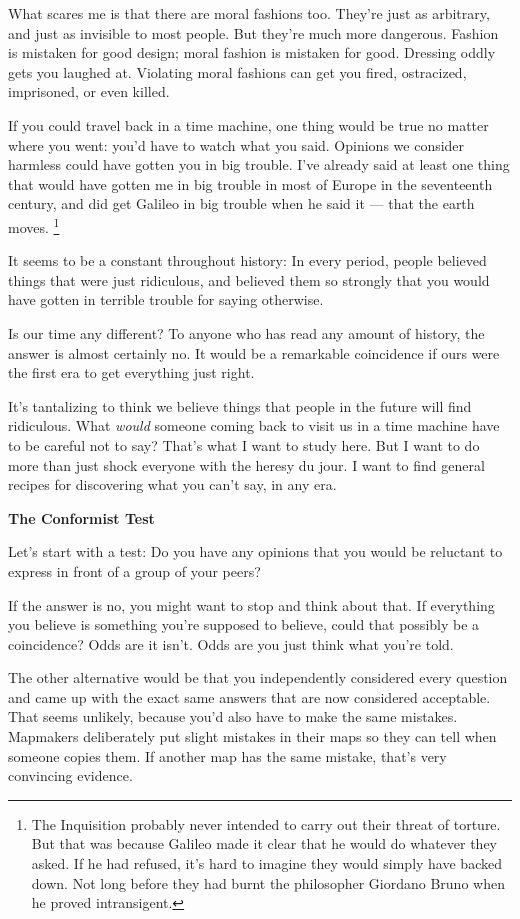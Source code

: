 \documentclass[12pt]{book}
\begin{document}
What scares me is that there are moral fashions too. They're just as
arbitrary, and just as invisible to most people. But they're much more
dangerous. Fashion is mistaken for good design; moral fashion is
mistaken for good. Dressing oddly gets you laughed at. Violating moral
fashions can get you fired, ostracized, imprisoned, or even killed.

If you could travel back in a time machine, one thing would be true no
matter where you went: you'd have to watch what you said. Opinions we
consider harmless could have gotten you in big trouble. I've already
said at least one thing that would have gotten me in big trouble in most
of Europe in the seventeenth century, and did get Galileo in big trouble
when he said it --- that the earth moves. \footnote{The Inquisition probably never intended to carry out their
threat of torture. But that was because Galileo made it clear that he
would do whatever they asked. If he had refused, it's hard to imagine
they would simply have backed down. Not long before they had burnt the
philosopher Giordano Bruno when he proved intransigent.}

It seems to be a constant throughout history: In every period, people
believed things that were just ridiculous, and believed them so strongly
that you would have gotten in terrible trouble for saying otherwise.

Is our time any different? To anyone who has read any amount of history,
the answer is almost certainly no. It would be a remarkable coincidence
if ours were the first era to get everything just right.

It's tantalizing to think we believe things that people in the future
will find ridiculous. What \emph{would} someone coming back to visit us
in a time machine have to be careful not to say? That's what I want to
study here. But I want to do more than just shock everyone with the
heresy du jour. I want to find general recipes for discovering what you
can't say, in any era.

\textbf{The Conformist Test}

Let's start with a test: Do you have any opinions that you would be
reluctant to express in front of a group of your peers?

If the answer is no, you might want to stop and think about that. If
everything you believe is something you're supposed to believe, could
that possibly be a coincidence? Odds are it isn't. Odds are you just
think what you're told.

The other alternative would be that you independently considered every
question and came up with the exact same answers that are now considered
acceptable. That seems unlikely, because you'd also have to make the
same mistakes. Mapmakers deliberately put slight mistakes in their maps
so they can tell when someone copies them. If another map has the same
mistake, that's very convincing evidence.
\end{document}
